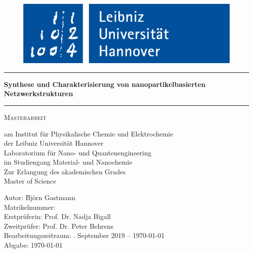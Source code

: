 
\begin{titlepage}
\centering
\begin{figure}
	\centering
\includegraphics[width=0.3\linewidth,trim=0 0 0 5]{Bilder/LUH}
\end{figure}

\vspace{1cm}
\noindent\hrule
{\huge\bfseries Synthese und Charakterisierung von nanopartikelbasierten Netzwerkstrukturen \par}
\noindent\hrule
\vspace{1cm}
{\scshape\Large Masterarbeit\par}
am Institut für Physikalische Chemie und Elektrochemie\\
der Leibniz Universität Hannover\\
Laboratorium für Nano- und Quantenengineering\\
\vspace{0.5cm}
im Studiengang Material- und Nanochemie\\
\vspace{0.5cm}
Zur Erlangung des akademischen Grades\\
Master of Science

\vfill
\begin{flushleft}
\begin{tabbing}
Autor: \qquad\qquad\qquad\qquad \= Björn Gastmann\\
Matrikelnummer: \\
Erstprüferin: \> Prof. Dr. Nadja Bigall\\
Zweitprüfer: \> Prof. Dr. Peter Behrens\\
Bearbeitungszeitraum: . September 2019 -- \today\\
Abgabe: \> \today\\
\end{tabbing}
\end{flushleft}
\end{titlepage}